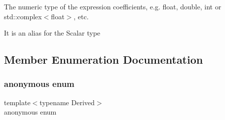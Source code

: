 The numeric type of the expression\textquotesingle{} coefficients, e.\+g. float, double, int or std\+::complex$<$float$>$, etc.

It is an alias for the Scalar type 

\subsection{Member Enumeration Documentation}
\mbox{\label{class_eigen_1_1_dense_base_a86241c772c74c04eeeb0480b99c5ab77}} 
\subsubsection{\texorpdfstring{anonymous enum}{anonymous enum}}
{\footnotesize\ttfamily template$<$typename Derived$>$ \\
anonymous enum}

